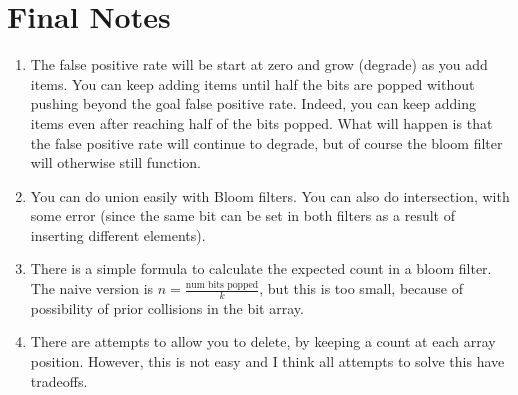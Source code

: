 \documentclass[11pt, oneside]{amsart}
\begin{document}
\section{Final Notes}

\begin{enumerate}

\item The false positive rate will be start at zero and grow (degrade)
as you add items. You can keep adding items until half the bits are
popped without pushing beyond the goal false positive rate. Indeed, you
can keep adding items even after reaching half of the bits popped. What
will happen is that the false positive rate will continue to degrade,
but of course the bloom filter will otherwise still function.

\item You can do union easily with Bloom filters. You can also do
intersection, with some error (since the same bit can be set in both
filters as a result of inserting different elements).

\item There is a simple formula to calculate the expected count in a
bloom filter. The naive version is $n = \frac{\text{num bits
popped}}{k}$, but this is too small, because of possibility of prior
collisions in the bit array.

\item There are attempts to allow you to delete, by keeping a count at
each array position. However, this is not easy and I think all attempts
to solve this have tradeoffs.

\end{enumerate}
\end{document}

